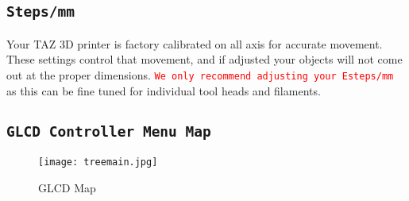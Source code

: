 \subsection{\texttt{Steps/mm}}
Your TAZ 3D printer is factory calibrated on all axis for accurate movement. These settings control that movement, and if adjusted your objects will not come out at the proper dimensions. \textcolor{red}{\texttt{We only recommend adjusting your Esteps/mm}} as this can be fine tuned for individual tool heads and filaments. 

\subsection{\texttt{GLCD Controller Menu Map}}
\begin{figure}[H]
\centering
\texttt{[image: treemain.jpg]}
\caption{GLCD Map}
\label{fig:GLCD_Map}
\end{figure}




